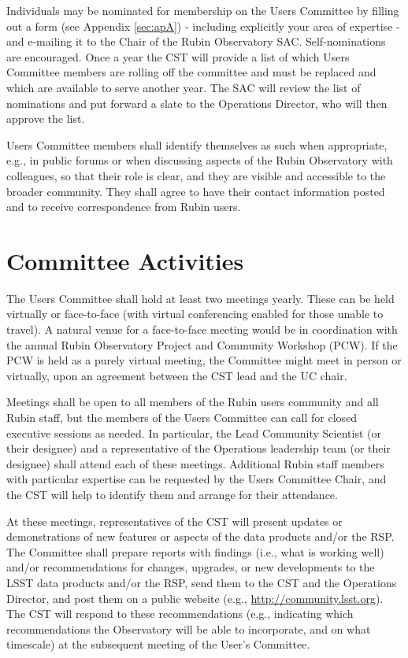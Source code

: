 \documentclass[OPS,toc]{lsstdoc}
\begin{document}
Individuals may be nominated for membership on the Users Committee by filling out a form (see Appendix \ref{sec:apA}) - including explicitly your area of expertise - and e-mailing it to the Chair of the Rubin Observatory SAC.
Self-nominations are  encouraged.
Once a year the CST will provide a list of which Users Committee members are rolling off the committee and must be replaced and which are available to serve another year.
The SAC will review the list of nominations and put forward a slate to the Operations Director, who will then approve the list.

Users Committee members shall identify themselves as such when appropriate, e.g., in public forums or when discussing aspects of the Rubin Observatory with colleagues, so that their role is clear, and they are visible and accessible to the broader community.
They shall agree to have their contact information posted and to receive correspondence from Rubin users.

\section{Committee Activities}

The Users Committee shall hold at least two meetings yearly.
These can be held virtually or face-to-face (with virtual conferencing enabled for those unable to travel).
A natural venue for a face-to-face meeting would be in coordination with the annual Rubin Observatory 
Project and Community Workshop (PCW).
If the PCW is held as a purely virtual meeting, the Committee might meet in person or virtually, upon an agreement between the CST lead and the UC chair.  

Meetings shall be open to all members of the Rubin users community and all Rubin staff, but the members of the 
Users Committee can call for closed executive sessions as needed.
In particular, the Lead Community Scientist (or their designee) and a representative of the Operations 
leadership team (or their designee) shall attend each of these meetings.
Additional Rubin staff members with particular expertise can be requested by the Users Committee Chair, 
and the CST will help to identify them and arrange for their attendance.

At these meetings, representatives of the CST will present updates or demonstrations of new features or 
aspects of the data products and/or the RSP.
The Committee shall prepare reports with findings (i.e., what is working well) 
and/or recommendations for changes, upgrades, or new developments to the 
LSST data products and/or the RSP, send them to the CST and the Operations Director, and post them on a 
public website (e.g., \url{http://community.lsst.org}).
The CST will respond to these recommendations (e.g., indicating which recommendations the Observatory will 
be able to incorporate, and on what timescale) at the subsequent meeting of the User’s Committee.  
\end{document}
